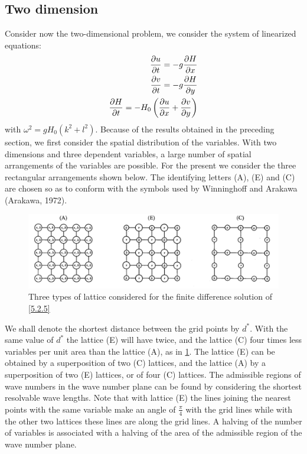 \subsection{Two dimension}
Consider now the two-dimensional problem, we consider the system of linearized equations:
\begin{align}\label{5.2.5}
    \frac{\partial u}{\partial t}=-g\frac{\partial H}{\partial x} \\
    \frac{\partial v}{\partial t}=-g\frac{\partial H}{\partial y} \notag \\
    \frac{\partial H}{\partial t}=-H_0\left(\frac{\partial u}{\partial x}+\frac{\partial v}{\partial y}\right)\notag
\end{align}
with $\omega^2=gH_0(k^2+l^2)$. Because of the results obtained in the preceding section, we first consider the spatial distribution of the variables. With two dimensions and three dependent variables, a large number of spatial arrangements of the variables are possible. For the present we consider the three rectangular arrangements shown below. The identifying letters (A), (E) and (C) are chosen so as to conform with the symbols used by Winninghoff and Arakawa (Arakawa, 1972).
\begin{figure}[h]
    \centering
    \includegraphics[width=0.5\linewidth]{uploads/Screenshot 2024-11-14 114112.png}
    \caption{Three types of lattice considered for the finite difference solution of \ref{5.2.5}}
    \label{fig:5.2.1}
\end{figure}
We shall denote the shortest distance between the grid points by $d^*$. With the same value of $d^*$ the lattice (E) will have twice, and the lattice (C) four times less variables per unit area than the lattice (A), as in \ref{fig:5.2.1}. The lattice (E) can be obtained by a superposition of two (C) lattices, and the lattice (A) by a superposition of two (E) lattices, or of four (C) lattices. 
The admissible regions of wave numbers in the wave number plane can be found by considering the shortest resolvable wave lengths. Note that with lattice (E) the lines joining the nearest points with the same variable make an angle of $\frac{\pi}{4}$ with the grid lines while with the other two lattices these lines are along the grid lines. A halving of the number of variables is associated with a halving of the area of the admissible region of the wave number plane. 

